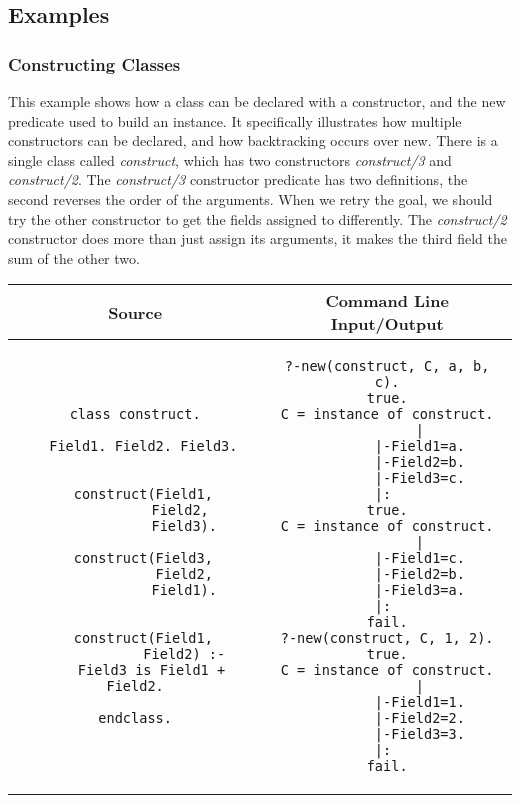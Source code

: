 \documentclass[12pt,a4paper,twoside,openright]{report}
\begin{document}
\subsection{Examples}

	\subsubsection{Constructing Classes}
	
	This example shows how a class can be declared with a constructor, and the new predicate used to build an instance. It specifically illustrates how multiple constructors can be declared, and how backtracking occurs over new. There is a single class called \emph{construct}, which has two constructors \emph{construct/3} and  \emph{construct/2}.  The \emph{construct/3} constructor predicate has two definitions, the second reverses the order of the arguments. When we retry the goal, we should try the other constructor to get the fields assigned to differently. The  \emph{construct/2} constructor does more than just assign its arguments, it makes the third field the sum of the other two.
	
\begin{center}
\begin{tabular}{c|c}
	Source & Command Line Input/Output \\
	\hline
	\small
\begin{lstlisting}
class construct.

  Field1. Field2. Field3.

		
  construct(Field1,
            Field2, 
            Field3).
  
  construct(Field3,
            Field2,
            Field1).


  construct(Field1,
            Field2) :-
    Field3 is Field1 + Field2.
    
endclass.
\end{lstlisting}

&
	\small
\begin{lstlisting}
?-new(construct, C, a, b, c).
true.
C = instance of construct.
        |
        |-Field1=a.
        |-Field2=b.
        |-Field3=c.
|: 
true.
C = instance of construct.
        |
        |-Field1=c.
        |-Field2=b.
        |-Field3=a.
|: 
fail.
?-new(construct, C, 1, 2).
true.
C = instance of construct.
        |
        |-Field1=1.
        |-Field2=2.
        |-Field3=3.
|: 
fail.
\end{lstlisting}

\\
\end{tabular}
\end{center}
\end{document}
